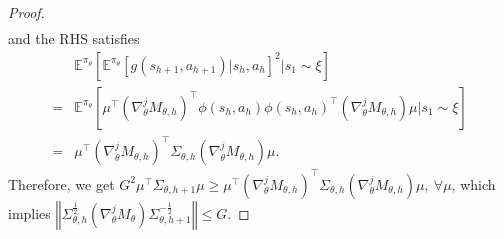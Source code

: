 \documentclass{article}
\numberwithin{equation}{section}
\begin{document}
\begin{proof}
\begin{align*}
\end{align*}
and the RHS satisfies 
\begin{align*}
    &\mathbb{E}^{\pi_\theta}[\mathbb{E}^{\pi_\theta}[g(s_{h+1},a_{h+1})\vert s_h, a_h]^2\vert s_1\sim\xi]\\
    =&\mathbb{E}^{\pi_\theta}[\mu^\top\left(\nabla_\theta^j M_{\theta,h}\right)^\top \phi(s_h,a_h)\phi(s_h,a_h)^\top\left(\nabla_\theta^j M_{\theta,h}\right)\mu\vert s_1\sim\xi]\\
    =&\mu^\top\left(\nabla_\theta^j M_{\theta,h}\right)^\top\Sigma_{\theta,h}\left(\nabla_\theta^j M_{\theta,h}\right)\mu.
\end{align*}
Therefore, we get $G^2\mu^\top\Sigma_{\theta,h+1}\mu\geq\mu^\top\left(\nabla_\theta^j M_{\theta,h}\right)^\top\Sigma_{\theta,h}\left(\nabla_\theta^j M_{\theta,h}\right)\mu,\ \forall\mu$, which implies $\left\Vert \Sigma_{\theta,h}^{\frac{1}{2}}\left(\nabla_\theta^j M_\theta\right)\Sigma_{\theta,h+1}^{-\frac{1}{2}}\right\Vert \leq G$.
\end{proof}
\end{document}
